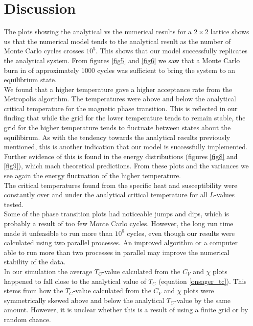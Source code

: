 \documentclass[notitlepage, reprint, nofootinbib]{revtex4-1}
\begin{document}
\clearpage
\section{Discussion}
The plots showing the analytical vs the numerical results for a $2\times2$ lattice shows us that the numerical model tends to the analytical result as the number of Monte Carlo cycles crosses $10^5$. This shows that our model successfully replicates the analytical system. From figures \ref{fig5} and \ref{fig6} we saw that a Monte Carlo burn in of approximately 1000 cycles was sufficient to bring the system to an equilibrium state. \\[2mm]
We found that a higher temperature gave a higher acceptance rate from the Metropolis algorithm. The temperatures were above and below the analytical critical temperature for the magnetic phase transition. This is reflected in our finding that while the grid for the lower temperature tends to remain stable, the grid for the higher temperature tends to fluctuate between states about the equilibirum. As with the tendency towards the analytical results previously mentioned, this is another indication that our model is successfully implemented. Further evidence of this is found in the energy distributions (figures \ref{fig8} and \ref{fig9}), which mach theoretical predictions. From these plots and the variances we see again the energy fluctuation of the higher temperature.\\[2mm] 
The critical temperatures found from the specific heat and susceptibility were constantly over and under the analytical critical temperature for all $L$-values tested. \\[2mm]
Some of the phase transition plots had noticeable jumps and dips, which is probably a result of too few Monte Carlo cycles. However, the long run time made it unfeasible to run more than $10^6$ cycles, even though our results were calculated using two parallel processes. An improved algorithm or a computer able to run more than two processes in parallel may improve the numerical stability of the data. \\[2mm]
In our simulation the average $T_C$-value calculated from the $C_V$ and $\chi$ plots happened to fall close to the analytical value of $T_C$ (equation \ref{onsager_tc}). This stems from how the $T_C$-value calculated from the $C_V$ and $\chi$ plots were symmetrically skewed above and below the analytical $T_C$-value by the same amount. However, it is unclear whether this is a result of using a finite grid or by random chance. 
\end{document}
